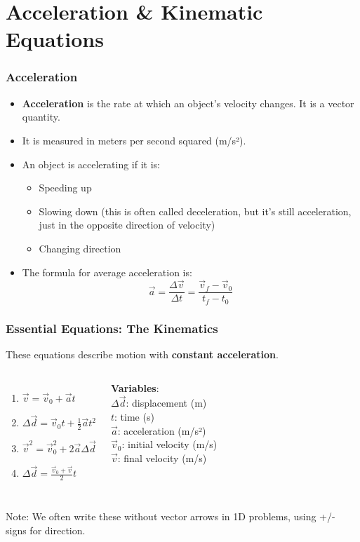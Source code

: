\documentclass{beamer}
\begin{document}
\section{Acceleration \& Kinematic Equations}

\begin{frame}
\frametitle{Acceleration}
\begin{itemize}
    \item \textbf{Acceleration} is the rate at which an object's velocity changes. It is a \alert{vector} quantity.
    \item It is measured in meters per second squared (m/s²).
    \item An object is accelerating if it is:
    \begin{itemize}
        \item Speeding up
        \item Slowing down (this is often called deceleration, but it's still acceleration, just in the opposite direction of velocity)
        \item Changing direction
    \end{itemize}
    \item The formula for average acceleration is:
    \[ \vec{a} = \frac{\Delta \vec{v}}{\Delta t} = \frac{\vec{v}_f - \vec{v}_0}{t_f - t_0} \]
\end{itemize}
\end{frame}

\begin{frame}
\frametitle{Essential Equations: The Kinematics}
These equations describe motion with \textbf{constant acceleration}.
\begin{columns}
\begin{enumerate}
    \item $\vec{v} = \vec{v}_0 + \vec{a}t$
    \item $\Delta\vec{d} = \vec{v}_0 t + \frac{1}{2}\vec{a}t^2$
    \item $\vec{v}^2 = \vec{v}_0^2 + 2\vec{a}\Delta\vec{d}$
    \item $\Delta\vec{d} = \frac{\vec{v}_0 + \vec{v}}{2} t$
\end{enumerate}
\textbf{Variables}:\\
$\Delta\vec{d}$: displacement (m)\\
$t$: time (s)\\
$\vec{a}$: acceleration (m/s²)\\
$\vec{v}_0$: initial velocity (m/s)\\
$\vec{v}$: final velocity (m/s)
\end{columns}
\vspace{1em}
\alert{Note:} We often write these without vector arrows in 1D problems, using +/- signs for direction.
\end{frame}
\end{document}
